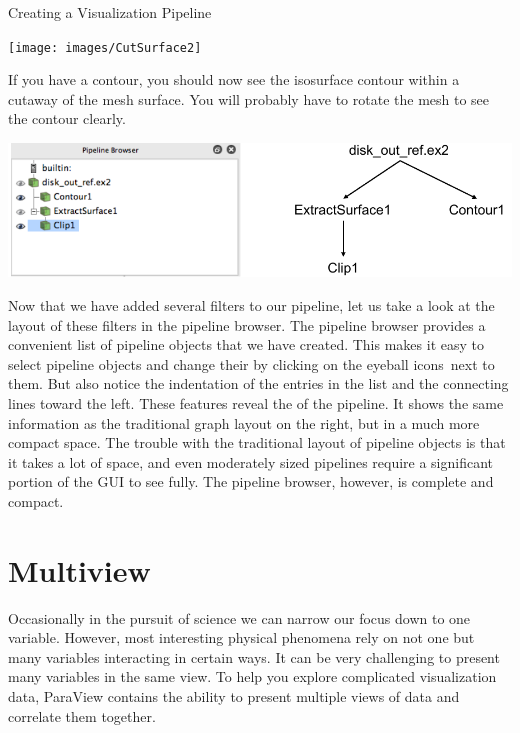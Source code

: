 \begin{exercise}{Creating a Visualization Pipeline}
  \begin{inlinefig}
    \texttt{[image: images/CutSurface2]}
  \end{inlinefig}

  If you have a contour, you should now see the isosurface contour within a
  cutaway of the mesh surface.  You will probably have to rotate the mesh
  to see the contour clearly.
\end{exercise}


\begin{inlinefig}
  \includegraphics[width=\linewidth]{images/PipelineBrowserStructure}
\end{inlinefig}

Now that we have added several filters to our pipeline, let us take a look
at the layout of these filters in the pipeline browser.  The pipeline
browser provides a convenient list of pipeline objects that we have created.
This makes it easy to select pipeline objects and change their
 by clicking on the eyeball icons~\eyeball next to
them.  But also notice the indentation of the entries in the list and the
connecting lines toward the left.  These features reveal the
 of the pipeline.  It shows the same information as
the traditional graph layout on the right, but in a much more compact
space.  The trouble with the traditional layout of pipeline objects is that
it takes a lot of space, and even moderately sized pipelines require a
significant portion of the GUI to see fully.  The pipeline browser,
however, is complete and compact.




\section{Multiview}
\label{sec:Multiview}

Occasionally in the pursuit of science we can narrow our focus down to one
variable.  However, most interesting physical phenomena rely on not one but
many variables interacting in certain ways.  It can be very challenging to
present many variables in the same view.  To help you explore complicated
visualization data, ParaView contains the ability to present multiple views
of data and correlate them together.

